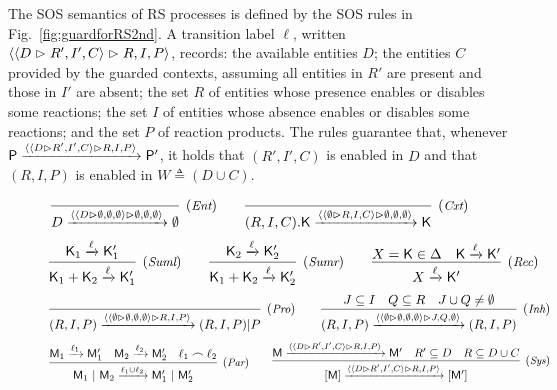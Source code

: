 The SOS semantics of  RS processes is defined by the SOS rules in Fig.~\ref{fig:guardforRS2nd}.
A transition label $\ell$, written $\langle \langle D\vartriangleright R',I',C\rangle\vartriangleright R,I,P\rangle$, records:
the available entities $D$; the entities $C$ provided by the guarded contexts, assuming all entities in $R'$ are present and those in $I'$ are absent;
the set $R$ of entities whose presence enables or disables some reactions;
the set $I$ of entities whose absence  enables or disables some reactions;
and the set $P$ of reaction products.
The  rules guarantee that, whenever $\mathsf{P}\xrightarrow{\langle \langle D\vartriangleright R',I',C\rangle\vartriangleright R,I,P\rangle} \mathsf{P}'$, it holds that $(R',I',C)$ is enabled in $D$ and that
$(R,I,P)$ is enabled in $W\triangleq (D\cup C)$.

\begin{figure*}[t]
		$$  
		\infer[(\textit{\scriptsize{Ent}})]
		{D \xrightarrow{\obs{\obs{D}{\emptyset,\emptyset,\emptyset}}{\emptyset,\emptyset,\emptyset}}\emptyset}
		{}
		\qquad
		\infer[(\textit{\scriptsize{Cxt}})]
		{(R,I,C).\mathsf{K} \xrightarrow{\obs{\obs{\emptyset}{R,I,C}}{\emptyset,\emptyset,\emptyset}}\mathsf{K}}{}
		$$
		$$
		\infer[(\textit{\scriptsize Suml})]
		{\mathsf{K}_1 + \mathsf{K}_2 \xrightarrow{\ell}\mathsf{K}'_1}
		{\mathsf{K}_1 \xrightarrow{\ell}\mathsf{K}'_1}
		\qquad
		\infer[(\textit{\scriptsize Sumr})]
		{\mathsf{K}_1 + \mathsf{K}_2 \xrightarrow{\ell}\mathsf{K}'_2}
		{\mathsf{K}_2 \xrightarrow{\ell}\mathsf{K}'_2}
		\qquad
		\infer[(\textit{\scriptsize Rec})]
		{X \xrightarrow{\ell}\mathsf{K}'}
		{X=\mathsf{K}\in\Delta & \mathsf{K} \xrightarrow{\ell}\mathsf{K}'}
		$$
		$$
		\infer[(\textit{\scriptsize Pro})]
		{(R,I,P)  \xrightarrow{\obs{\obs{\emptyset}{\emptyset,\emptyset,\emptyset}}{R,I,P}}(R,I,P)|P}
		{}
		\qquad
		\infer[(\textit{\scriptsize Inh})]
		{(R,I,P)  \xrightarrow{\obs{\obs{\emptyset}{\emptyset,\emptyset,\emptyset}}{J,Q,\emptyset}}(R,I,P)}
		{J \subseteq I & Q \subseteq R & J\cup Q\neq \emptyset}
		$$
		$$
		\infer[(\textit{\scriptsize Par})]
		{\mathsf{M}_1~|~\mathsf{M}_2\xrightarrow{\ell_1\cup\ell_2} \mathsf{M}'_1~|~\mathsf{M}'_2}
		{\mathsf{M}_1 \xrightarrow{\ell_1} \mathsf{M}'_1 &
		\mathsf{M}_2 \xrightarrow{\ell_2} \mathsf{M}'_2 &
			\ell_1\frown \ell_2 }
		\qquad
		\infer[(\textit{\scriptsize Sys})]
		{[\mathsf{M}]\xrightarrow{\obs{\obs{D}{R',I',C}}{R,I,P}} [\mathsf{M}']}
		{\mathsf{M}\xrightarrow{\obs{\obs{D}{R',I',C}}{R,I,P}} \mathsf{M}' &
		R'\subseteq D &
        R\subseteq D\cup C}
		$$


\end{figure*}
